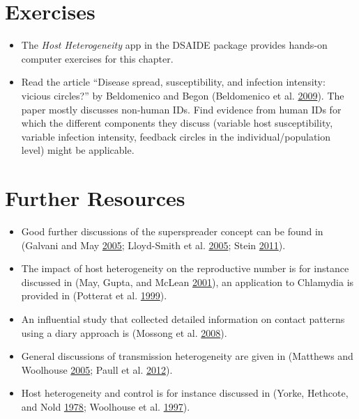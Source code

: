 \documentclass[]{book}
\providecommand{\tightlist}{%
  \setlength{\itemsep}{0pt}\setlength{\parskip}{0pt}}
\theoremstyle{definition}
\theoremstyle{definition}
\theoremstyle{definition}
\theoremstyle{remark}
\begin{document}
\section{Exercises}\label{exercises-10}

\begin{itemize}
\tightlist
\item
  The \emph{Host Heterogeneity} app in the DSAIDE package provides
  hands-on computer exercises for this chapter.
\item
  Read the article ``Disease spread, susceptibility, and infection
  intensity: vicious circles?'' by Beldomenico and Begon (Beldomenico et
  al. \protect\hyperlink{ref-beldomenico09}{2009}). The paper mostly
  discusses non-human IDs. Find evidence from human IDs for which the
  different components they discuss (variable host susceptibility,
  variable infection intensity, feedback circles in the
  individual/population level) might be applicable.
\end{itemize}

\section{Further Resources}\label{further-resources-10}

\begin{itemize}
\tightlist
\item
  Good further discussions of the superspreader concept can be found in
  (Galvani and May \protect\hyperlink{ref-galvani05}{2005}; Lloyd-Smith
  et al. \protect\hyperlink{ref-lloyd-smith05}{2005}; Stein
  \protect\hyperlink{ref-stein11}{2011}).
\item
  The impact of host heterogeneity on the reproductive number is for
  instance discussed in (May, Gupta, and McLean
  \protect\hyperlink{ref-may01}{2001}), an application to Chlamydia is
  provided in (Potterat et al.
  \protect\hyperlink{ref-potterat99}{1999}).
\item
  An influential study that collected detailed information on contact
  patterns using a diary approach is (Mossong et al.
  \protect\hyperlink{ref-mossong08}{2008}).
\item
  General discussions of transmission heterogeneity are given in
  (Matthews and Woolhouse \protect\hyperlink{ref-matthews05}{2005};
  Paull et al. \protect\hyperlink{ref-paull12}{2012}).
\item
  Host heterogeneity and control is for instance discussed in (Yorke,
  Hethcote, and Nold \protect\hyperlink{ref-yorke78}{1978}; Woolhouse et
  al. \protect\hyperlink{ref-woolhouse97}{1997}).
\end{itemize}
\end{document}
